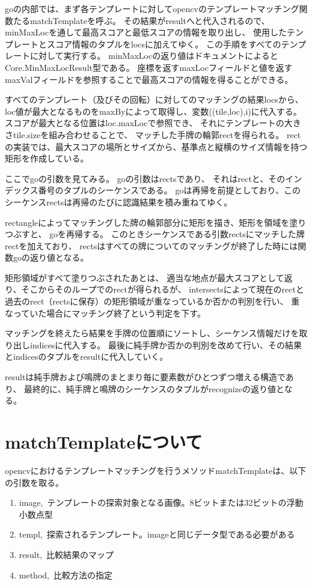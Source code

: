 \documentclass{jsarticle}
\begin{document}
\begin{multicols}{2}
goの内部では、まず各テンプレートに対してopencvのテンプレートマッチング関数たるmatchTemplateを呼ぶ。
その結果がresultへと代入されるので、
minMaxLocを通して最高スコアと最低スコアの情報を取り出し、
使用したテンプレートとスコア情報のタプルをlocsに加えてゆく。
この手順をすべてのテンプレートに対して実行する。
minMaxLocの返り値はドキュメントによると\cite{minMaxLoc}
Core.MinMaxLocResult型である。
座標を返すmaxLocフィールドと値を返すmaxValフィールドを参照することで最高スコアの情報を得ることができる。

すべてのテンプレート（及びその回転）に対してのマッチングの結果locsから、
loc値が最大となるものをmaxByによって取得し、変数((tile,loc),i)に代入する。
スコアが最大となる位置はloc.maxLocで参照でき、
それにテンプレートの大きさtile.sizeを組み合わせることで、
マッチした手牌の輪郭rectを得られる。
rectの実装では、最大スコアの場所とサイズから、基準点と縦横のサイズ情報を持つ矩形を作成している。

ここでgoの引数を見てみる。
goの引数はrectsであり、
それはrectと、そのインデックス番号のタプルのシーケンスである。
goは再帰を前提としており、このシーケンスrectsは再帰のたびに認識結果を積み重ねてゆく。

rectangleによってマッチングした牌の輪郭部分に矩形を描き、矩形を領域を塗りつぶすと、
goを再帰する。
このときシーケンスである引数rectsにマッチした牌rectを加えており、
rectsはすべての牌についてのマッチングが終了した時には関数goの返り値となる。

矩形領域がすべて塗りつぶされたあとは、
適当な地点が最大スコアとして返り、そこからそのループでのrectが得られるが、
intersectsによって現在のrectと過去のrect（rectsに保存）の矩形領域が重なっているか否かの判別を行い、
重なっていた場合にマッチング終了という判定を下す。

マッチングを終えたら結果を手牌の位置順にソートし、シーケンス情報だけを取り出しindicesに代入する。
最後に純手牌か否かの判別を改めて行い、その結果とindicesのタプルをresultに代入していく。

resultは純手牌および鳴牌のまとまり毎に要素数がひとつずつ増える構造であり、
最終的に、純手牌と鳴牌のシーケンスのタプルがrecognizeの返り値となる。

\section{matchTemplateについて}

opencvにおけるテンプレートマッチングを行うメソッドmatchTemplateは、以下の引数を取る。
\begin{enumerate}
\item image,\ テンプレートの探索対象となる画像。8ビットまたは32ビットの浮動小数点型
\item templ,\ 探索されるテンプレート。imageと同じデータ型である必要がある
\item result,\ 比較結果のマップ
\item method,\ 比較方法の指定
\end{enumerate}


\end{multicols}
\end{document}
